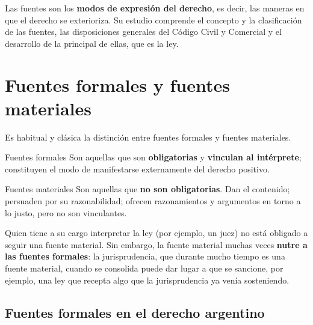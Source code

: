\documentclass[12pt,oneside]{book}
\begin{document}
Las fuentes son los \textbf{modos de expresión del derecho}, es decir, las maneras en que el derecho se exterioriza. Su estudio comprende el concepto y la clasificación de las fuentes, las disposiciones generales del Código Civil y Comercial y el desarrollo de la principal de ellas, que es la ley.

\section{Fuentes formales y fuentes materiales}

Es habitual y clásica la distinción entre fuentes formales y fuentes materiales.

\begin{definition}{Fuentes formales}
Son aquellas que son \textbf{obligatorias} y \textbf{vinculan al intérprete}; constituyen el modo de manifestarse externamente del derecho positivo.
\end{definition}

\begin{definition}{Fuentes materiales}
Son aquellas que \textbf{no son obligatorias}. Dan el contenido; persuaden por su razonabilidad; ofrecen razonamientos y argumentos en torno a lo justo, pero no son vinculantes.
\end{definition}

Quien tiene a su cargo interpretar la ley (por ejemplo, un juez) no está obligado a seguir una fuente material. Sin embargo, la fuente material muchas veces \textbf{nutre a las fuentes formales}: la jurisprudencia, que durante mucho tiempo es una fuente material, cuando se consolida puede dar lugar a que se sancione, por ejemplo, una ley que recepta algo que la jurisprudencia ya venía sosteniendo.

\subsection{Fuentes formales en el derecho argentino}
\end{document}
